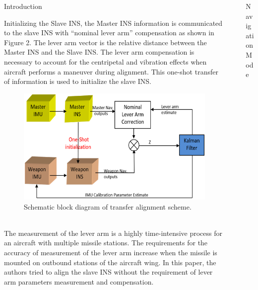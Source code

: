 \documentclass[final]{beamer}
\newlength{\sepwidth}
\newlength{\colwidth}
\newcommand{\separatorcolumn}{\begin{column}{\sepwidth}\end{column}}
\begin{document}
\begin{frame}[t]
\begin{columns}[t]
\begin{column}{\colwidth}
\begin{block}{Introduction}
\par Initializing the Slave INS, the Master INS information is communicated to the slave INS with ``nominal lever arm'' compensation as shown in Figure 2. The lever arm vector is the relative distance between the Master INS and the Slave INS. The lever arm compensation is necessary to account for the centripetal and vibration effects when aircraft performs a maneuver during alignment. This one-shot \cite{titterton2004strapdown} transfer of information is used to initialize the slave INS.
\\
\lipsum
\begin{figure}
    \centering
    \includegraphics[width=1.0\textwidth]{logos/sambhav2a.png}
    \caption{ Schematic block diagram of transfer alignment scheme.}
    \label{fig:img1}
\end{figure}
\lipsum
\\The measurement of the lever arm is a highly time-intensive process for an aircraft with multiple missile stations. The requirements for the accuracy of measurement of the lever arm increase when the missile is mounted on outbound stations of the aircraft wing. In this paper, the authors tried to align the slave INS without the requirement of lever arm parameters measurement and compensation.
  \end{block}
\end{column}
\separatorcolumn

\begin{column}{\colwidth}

\begin{block}{Navigation Mode}
  

\end{block}
\end{column}
\end{columns}
\end{frame}
\end{document}
